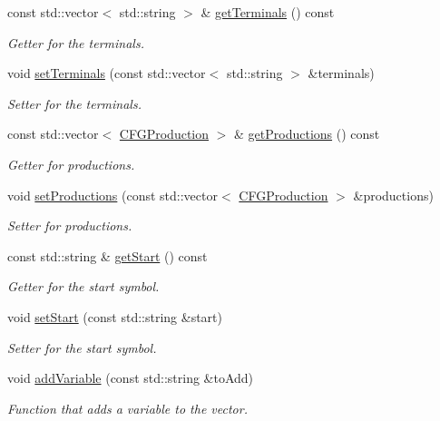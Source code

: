 \begin{DoxyCompactItemize}
const std\+::vector$<$ std\+::string $>$ \& \hyperlink{classCFG_a70877e28777701a8abc6041b88fd0df3}{get\+Terminals} () const
\begin{DoxyCompactList}\small\item\em Getter for the terminals. \end{DoxyCompactList}\item 
void \hyperlink{classCFG_afa23352455a95ef16da68fea06c9f3aa}{set\+Terminals} (const std\+::vector$<$ std\+::string $>$ \&terminals)
\begin{DoxyCompactList}\small\item\em Setter for the terminals. \end{DoxyCompactList}\item 
const std\+::vector$<$ \hyperlink{classCFGProduction}{C\+F\+G\+Production} $>$ \& \hyperlink{classCFG_aa3cb4eae9c5728ad55614ea77125a9c1}{get\+Productions} () const
\begin{DoxyCompactList}\small\item\em Getter for productions. \end{DoxyCompactList}\item 
void \hyperlink{classCFG_a0901757d0f9369339ebf933b611e244e}{set\+Productions} (const std\+::vector$<$ \hyperlink{classCFGProduction}{C\+F\+G\+Production} $>$ \&productions)
\begin{DoxyCompactList}\small\item\em Setter for productions. \end{DoxyCompactList}\item 
const std\+::string \& \hyperlink{classCFG_a34af6b5b23159e08693864d65e5078ff}{get\+Start} () const
\begin{DoxyCompactList}\small\item\em Getter for the start symbol. \end{DoxyCompactList}\item 
void \hyperlink{classCFG_adb6a876a834b63968c8389b8d632cfc0}{set\+Start} (const std\+::string \&start)
\begin{DoxyCompactList}\small\item\em Setter for the start symbol. \end{DoxyCompactList}\item 
void \hyperlink{classCFG_a1e6cdb62d1098d571e885f5664ab4eaa}{add\+Variable} (const std\+::string \&to\+Add)
\begin{DoxyCompactList}\small\item\em Function that adds a variable to the vector. \end{DoxyCompactList}\item 

\end{DoxyCompactItemize}
